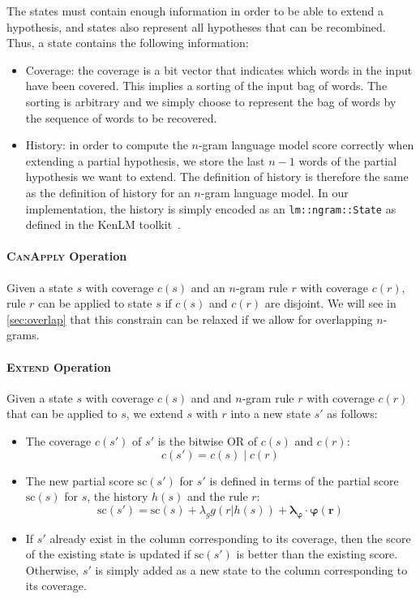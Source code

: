 The states must
contain enough information
in order to be able to extend a hypothesis, and
states also represent
all hypotheses that can be recombined. Thus, a state
contains the following information:
%
\begin{itemize}
  \item Coverage: the coverage is a bit vector that indicates
    which words in the input have been covered. This implies a
    sorting of the input bag of words. The sorting is arbitrary
    and we simply choose to represent the bag of words by the
    sequence of words to be recovered. %
  \item History: in order to compute the $n$-gram language model
    score correctly when extending a partial hypothesis, we
    store the last $n-1$ words of the partial hypothesis we want
    to extend. The definition of history is therefore the same
    as the definition of history for an $n$-gram language model.
    In our implementation, the history is simply encoded as
    an \texttt{lm::ngram::State} as defined in the KenLM
    toolkit~\citep{heafield:2011:WMT}.
\end{itemize}

\paragraph{\textsc{CanApply} Operation}
\label{sec:canApply}

Given a state $s$ with coverage $c(s)$ and an $n$-gram rule $r$ with
coverage $c(r)$, rule $r$ can be applied to state $s$ if $c(s)$ and
$c(r)$ are disjoint. We will see in \autoref{sec:overlap}
that this constrain can be relaxed if we allow for overlapping
$n$-grams.

\paragraph{\textsc{Extend} Operation}

Given a state $s$ with coverage $c(s)$ and and $n$-gram rule $r$
with coverage $c(r)$ that can be applied to $s$, we extend
$s$ with $r$ into a new state $s'$ as follows:
%
\begin{itemize}
  \item The coverage $c(s')$ of $s'$ is the bitwise OR
    of $c(s)$ and $c(r)$:
%
\begin{equation}
  c(s') = c(s) \mid c(r)
\end{equation}
%
  \item The new partial score $\text{sc}(s')$ for $s'$ is defined in terms
    of the partial score $\text{sc}(s)$ for $s$, the history $h(s)$ and the rule $r$:
%
\begin{equation}
  \text{sc}(s') = \text{sc}(s) + \lambda_g g(r | h(s)) + \bm{\lambda_{\varphi}} \cdot \bm{\varphi(r)}
\end{equation}
%
  \item If $s'$ already exist in the column corresponding to its coverage, then
    the score of the existing state is updated if $\text{sc}(s')$ is better than
    the existing score. Otherwise, $s'$ is simply added as a new state to the column corresponding
    to its coverage.
\end{itemize}
%

